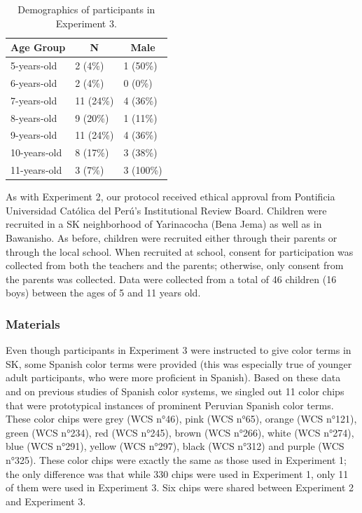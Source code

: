 \documentclass[
  english,
  ,man,floatsintext]{apa6}
\begin{document}
\begin{table}[tbp]
\begin{center}
\begin{threeparttable}
\caption{\label{tab:unnamed-chunk-5}Demographics of participants in Experiment 3.}
\begin{tabular}{lll}
\toprule
Age Group & \multicolumn{1}{c}{N} & \multicolumn{1}{c}{Male}\\
\midrule
5-years-old & 2 (4\%) & 1 (50\%)\\
6-years-old & 2 (4\%) & 0 (0\%)\\
7-years-old & 11 (24\%) & 4 (36\%)\\
8-years-old & 9 (20\%) & 1 (11\%)\\
9-years-old & 11 (24\%) & 4 (36\%)\\
10-years-old & 8 (17\%) & 3 (38\%)\\
11-years-old & 3 (7\%) & 3 (100\%)\\
\bottomrule
\end{tabular}
\end{threeparttable}
\end{center}
\end{table}

As with Experiment 2, our protocol received ethical approval from Pontificia Universidad Católica del Perú's Institutional Review Board. Children were recruited in a SK neighborhood of Yarinacocha (Bena Jema) as well as in Bawanisho. As before, children were recruited either through their parents or through the local school. When recruited at school, consent for participation was collected from both the teachers and the parents; otherwise, only consent from the parents was collected. Data were collected from a total of 46 children (16 boys) between the ages of 5 and 11 years old.

\hypertarget{materials-2}{%
\subsubsection{Materials}\label{materials-2}}

Even though participants in Experiment 3 were instructed to give color terms in SK, some Spanish color terms were provided (this was especially true of younger adult participants, who were more proficient in Spanish). Based on these data and on previous studies of Spanish color systems, we singled out 11 color chips that were prototypical instances of prominent Peruvian Spanish color terms. These color chips were grey (WCS n°46), pink (WCS n°65), orange (WCS n°121), green (WCS n°234), red (WCS n°245), brown (WCS n°266), white (WCS n°274), blue (WCS n°291), yellow (WCS n°297), black (WCS n°312) and purple (WCS n°325). These color chips were exactly the same as those used in Experiment 1; the only difference was that while 330 chips were used in Experiment 1, only 11 of them were used in Experiment 3. Six chips were shared between Experiment 2 and Experiment 3.
\end{document}
